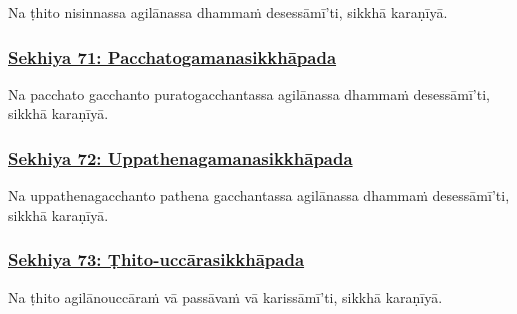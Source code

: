 Na ṭhito nisinnassa agilānassa dhammaṁ desessāmī'ti, sikkhā karaṇīyā.\makeatletter\hyperlink{endnote520-appendix}\makeatother \thinspace



\subsubsection*{\hyperref[training71]{Sekhiya 71: Pacchatogamanasikkhāpada}}
\label{sekh71}

Na pacchato gacchanto purato\makeatletter\hyperlink{endnote521-appendix}\makeatother \thinspace gacchantassa agilānassa dhammaṁ desessāmī'ti, sikkhā karaṇīyā.



\subsubsection*{\hyperref[training72]{Sekhiya 72: Uppathenagamanasikkhāpada}}
\label{sekh72}

Na uppathena\makeatletter\hyperlink{endnote522-appendix}\makeatother \thinspace gacchanto pathena gacchantassa agilānassa dhammaṁ desessāmī'ti, sikkhā karaṇīyā.\makeatletter\hyperlink{endnote523-appendix}\makeatother \thinspace



\subsubsection*{\hyperref[training73]{Sekhiya 73: Ṭhito-uccārasikkhāpada}}
\label{sekh73}

Na ṭhito agilāno\makeatletter\hyperlink{endnote524-appendix}\makeatother \thinspace uccāraṁ vā passāvaṁ vā karissāmī'ti, sikkhā karaṇīyā.




